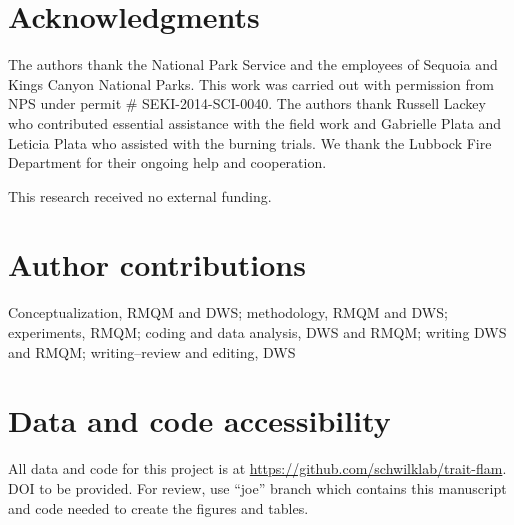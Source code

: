 \documentclass[letterpaper,12pt]{article}
\begin{document}

\section*{Acknowledgments}

The authors thank the National Park Service and the employees of Sequoia and
Kings Canyon National Parks. This work was carried out with permission from NPS
under permit \# SEKI-2014-SCI-0040. The authors thank Russell Lackey who
contributed essential assistance with the field work and Gabrielle Plata and
Leticia Plata who assisted with the burning trials. We thank the Lubbock Fire
Department for their ongoing help and cooperation.

This research received no external funding.

\section*{Author contributions}

Conceptualization, RMQM and DWS; methodology, RMQM and DWS; experiments, RMQM;
coding and data analysis, DWS and RMQM; writing DWS and RMQM; writing--review
and editing, DWS

\section*{Data and code accessibility}
All data and code for this project is at
\url{https://github.com/schwilklab/trait-flam}. DOI to be provided. For review,
use ``joe'' branch which contains this manuscript and code needed to create the
figures and tables.

\newpage




\end{document}
